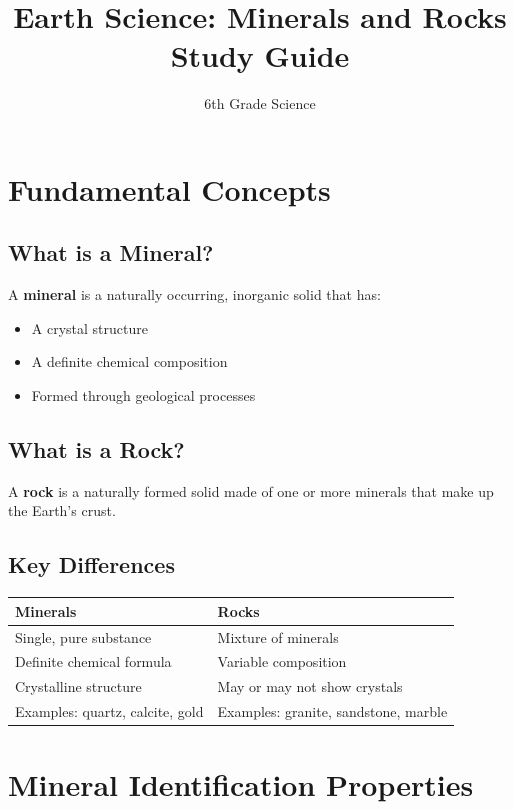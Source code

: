 \documentclass{article}
\begin{document}
\title{Earth Science: Minerals and Rocks Study Guide}
\author{6th Grade Science}
\date{}
\maketitle


\section{Fundamental Concepts}

\subsection{What is a Mineral?}
A \textbf{mineral} is a naturally occurring, inorganic solid that has:
\begin{itemize}
    \item A crystal structure
    \item A definite chemical composition
    \item Formed through geological processes
\end{itemize}

\subsection{What is a Rock?}
A \textbf{rock} is a naturally formed solid made of one or more minerals that make up the Earth's crust.

\subsection{Key Differences}
\begin{tabular}{@{}p{} p{}@{}}
\textbf{Minerals} & \textbf{Rocks} \\
\midrule
Single, pure substance & Mixture of minerals \\
Definite chemical formula & Variable composition \\
Crystalline structure & May or may not show crystals \\
Examples: quartz, calcite, gold & Examples: granite, sandstone, marble \\
\end{tabular}

\section{Mineral Identification Properties}
\end{document}

